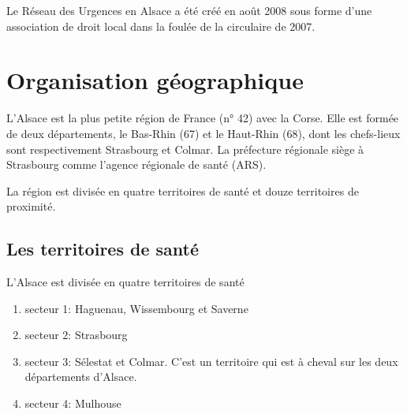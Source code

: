 \documentclass[12pt,english,french,twoside]{book}\usepackage[]{graphicx}\usepackage[]{color}
\begin{document}

Le Réseau des Urgences en Alsace a été créé en août 2008 sous forme d'une association de droit local dans la foulée de la circulaire de 2007.


\cite{16}

\newpage
\chapter{Organisation géographique}


L’Alsace est la plus petite région de France (n° 42) avec la Corse. Elle est formée de deux départements, le Bas-Rhin (67) et le Haut-Rhin (68), dont les chefs-lieux sont respectivement Strasbourg et Colmar. La préfecture régionale siège à Strasbourg comme l'agence régionale de santé  (ARS).

La région est divisée en quatre territoires de santé et douze territoires de proximité.


\section{Les territoires de santé}


L’Alsace est divisée en quatre territoires de santé
\begin{enumerate}
  \item secteur 1: Haguenau, Wissembourg et Saverne
  \item secteur 2: Strasbourg
  \item secteur 3: Sélestat et Colmar. C'est un territoire qui est à cheval sur les deux départements d'Alsace.
  \item secteur 4: Mulhouse
\end{enumerate}
\end{document}
